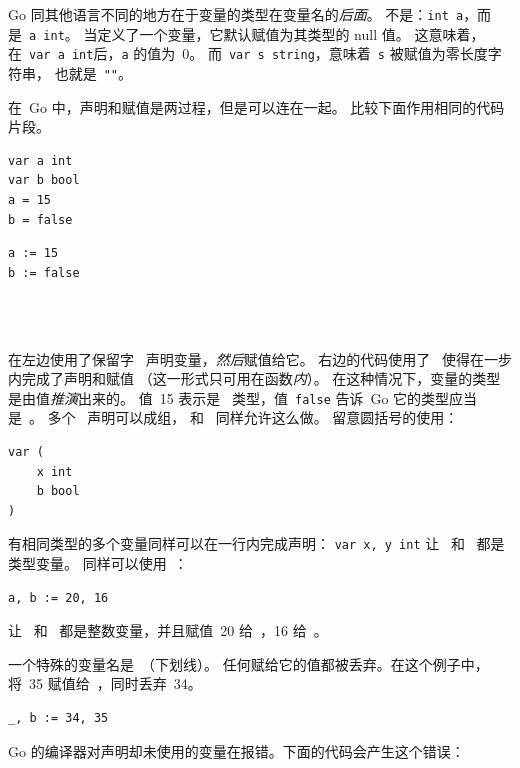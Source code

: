 Go 同其他语言不同的地方在于变量的类型在变量名的\emph{后面}。
不是：\lstinline{int a}，而是~\lstinline{a int}。
当定义了一个变量，它默认赋值为其类型的 null 值。
这意味着，在~\lstinline{var a int}后，\lstinline{a} 的值为~0。
而~\lstinline{var s string}，意味着~\lstinline{s} 被赋值为零长度字符串，
也就是~\lstinline{""}。

在~Go 中，声明和赋值是两过程，但是可以连在一起。
比较下面作用相同的代码片段。

\begin{minipage}{.5\textwidth}
\begin{lstlisting}[linewidth=.5\textwidth,caption={Declaration with =}]
var a int
var b bool
a = 15
b = false
\end{lstlisting}
\hfill
\end{minipage}
\begin{minipage}{.5\textwidth}
\begin{lstlisting}[linewidth=.5\textwidth,caption={Declaration with :=}]
a := 15
b := false
\end{lstlisting}
\ \\
\ \\
\hfill
\end{minipage}

在左边使用了保留字~ 声明变量，\emph{然后}赋值给它。
右边的代码使用了~\mbox{\key{:=}{ }} 使得在一步内完成了声明和赋值
（这一形式只可用在函数\emph{内}）。
在这种情况下，变量的类型是由值\emph{推演}出来的。
值~15 表示是~ 类型，值~\texttt{false} 告诉~Go 它的类型应当是~。
多个~ 声明可以成组， 和~ 同样允许这么做。
留意圆括号的使用：
\begin{lstlisting}
var (
    x int
    b bool
)
\end{lstlisting}

有相同类型的多个变量同样可以在一行内完成声明：
\lstinline{var x, y int} 让~ 和~ 都是~ 类型变量。
同样可以使用~：
\begin{lstlisting}
a, b := 20, 16
\end{lstlisting}
让~ 和~ 都是整数变量，并且赋值~20 给~，16 给~。

一个特殊的变量名是~\var{\textbf{\_}}（下划线）。
任何赋给它的值都被丢弃。在这个例子中，将~35 赋值给~，同时丢弃~34。
\begin{lstlisting}
_, b := 34, 35
\end{lstlisting}
Go 的编译器对声明却未使用的变量在报错。下面的代码会产生这个错误：


